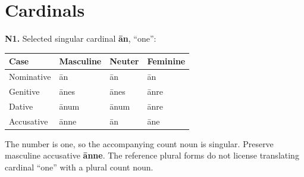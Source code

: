 \section*{Cardinals}

\par\begin{minipage}{\linewidth}\raggedright
\textbf{N1.} Selected singular cardinal \textbf{ān}, “one”:

\par\begingroup
\fontsize{10.5}{13.2}\selectfont
\setlength{\LTleft}{0pt}\setlength{\LTright}{\fill}
\noindent
\begin{tabular}{@{}>{\raggedright\arraybackslash}p{28.89mm}>{\raggedright\arraybackslash}p{28.89mm}>{\raggedright\arraybackslash}p{28.89mm}>{\raggedright\arraybackslash}p{28.89mm}@{}}
\toprule
\textbf{Case} & \textbf{Masculine} & \textbf{Neuter} & \textbf{Feminine} \\
\midrule
Nominative & ān & ān & ān \\
Genitive & ānes & ānes & ānre \\
Dative & ānum & ānum & ānre \\
Accusative & ānne & ān & āne \\
\bottomrule
\end{tabular}
\par\endgroup

The number is one, so the accompanying count noun is singular. Preserve masculine accusative \textbf{ānne}. The reference plural forms do not license translating cardinal “one” with a plural count noun.

\end{minipage}\par\addvspace{4pt}

